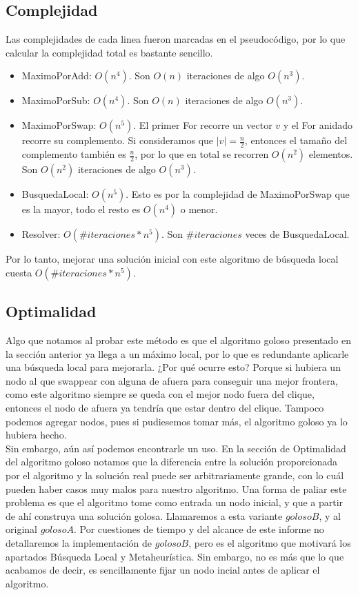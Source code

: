 \subsection{Complejidad}

Las complejidades de cada linea fueron marcadas en el pseudocódigo, por lo que calcular la complejidad total es bastante sencillo.

\begin{itemize}
    \item MaximoPorAdd: $O(n^4)$. Son $O(n)$ iteraciones de algo $O(n^3)$.
    \item MaximoPorSub: $O(n^4)$. Son $O(n)$ iteraciones de algo $O(n^3)$.
    \item MaximoPorSwap: $O(n^5)$. El primer For recorre un vector $v$ y el For anidado recorre su complemento. Si consideramos que $|v| = \frac{n}{2}$, entonces el tamaño del complemento también es $\frac{n}{2}$, por lo que en total se recorren $O(n^2)$ elementos. Son $O(n^2)$ iteraciones de algo $O(n^3)$.
    \item BusquedaLocal: $O(n^5)$. Esto es por la complejidad de MaximoPorSwap que es la mayor, todo el resto es $O(n^4)$ o menor.
    \item Resolver: $O(\#iteraciones * n^5)$. Son $\#iteraciones$ veces de BusquedaLocal.
\end{itemize}

Por lo tanto, mejorar una solución inicial con este algoritmo de búsqueda local cuesta $O(\#iteraciones * n^5)$.

\subsection{Optimalidad}

Algo que notamos al probar este método es que el algoritmo goloso presentado en la sección anterior ya llega a un máximo local, por lo que es redundante aplicarle una búsqueda local para mejorarla. ¿Por qué ocurre esto? Porque si hubiera un nodo al que swappear con alguna de afuera para conseguir una mejor frontera, como este algoritmo siempre se queda con el mejor nodo fuera del clique, entonces el nodo de afuera ya tendría que estar dentro del clique. Tampoco podemos agregar nodos, pues si pudiesemos tomar más, el algoritmo goloso ya lo hubiera hecho.  \\

Sin embargo, aún así podemos encontrarle un uso. En la sección de Optimalidad del algoritmo goloso notamos que la diferencia entre la solución proporcionada por el algoritmo y la solución real puede ser arbitrariamente grande, con lo cuál pueden haber casos muy malos para nuestro algoritmo. Una forma de paliar este problema es que el algoritmo tome como entrada un nodo inicial, y que a partir de ahí construya una solución golosa. Llamaremos a esta variante $golosoB$, y al original $golosoA$. Por cuestiones de tiempo y del alcance de este informe no detallaremos la implementación de $golosoB$, pero es el algoritmo que motivará los apartados Búsqueda Local y Metaheurística. Sin embargo, no es más que lo que acabamos de decir, es sencillamente fijar un nodo incial antes de aplicar el algoritmo. \\

